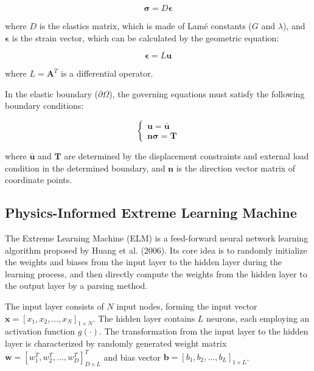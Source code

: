\documentclass[11pt]{article}
\begin{document}
\begin{equation}
\boldsymbol{\sigma} = D\boldsymbol{\epsilon}
\end{equation}

where $D$ is the elastics matrix, which is made of Lamé constants ($G$ and $\lambda$), and $\boldsymbol{\epsilon}$ is the strain vector, which can be calculated by the geometric equation:

\begin{equation}
\boldsymbol{\epsilon} = L\mathbf{u}
\end{equation}

where $L = \mathbf{A}^T$ is a differential operator.

In the elastic boundary ($\partial\Omega$), the governing equations must satisfy the following boundary conditions:

\begin{equation}
\begin{cases}
\mathbf{u} = \bar{\mathbf{u}} \\
\mathbf{n}\boldsymbol{\sigma} = \mathbf{T}
\end{cases}
\end{equation}

where $\bar{\mathbf{u}}$ and $\mathbf{T}$ are determined by the displacement constraints and external load condition in the determined boundary, and $\mathbf{n}$ is the direction vector matrix of coordinate points.

\subsection{Physics-Informed Extreme Learning Machine}

The Extreme Learning Machine (ELM) is a feed-forward neural network learning algorithm proposed by Huang et al. (2006). Its core idea is to randomly initialize the weights and biases from the input layer to the hidden layer during the learning process, and then directly compute the weights from the hidden layer to the output layer by a parsing method.

The input layer consists of $N$ input nodes, forming the input vector $\mathbf{x} = [x_1, x_2, \ldots, x_N]_{1 \times N}$. The hidden layer contains $L$ neurons, each employing an activation function $g(\cdot)$. The transformation from the input layer to the hidden layer is characterized by randomly generated weight matrix $\mathbf{w} = [w_1^T, w_2^T, \ldots, w_D^T]^T_{D \times L}$ and bias vector $\mathbf{b} = [b_1, b_2, \ldots, b_L]_{1 \times L}$.
\end{document}
